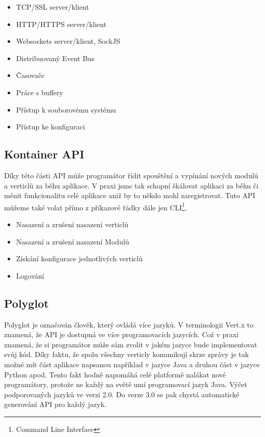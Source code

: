 \begin{itemize}
\item{TCP/SSL server/klient}
\item{HTTP/HTTPS server/klient}
\item{Websockets server/klient, SockJS}
\item{Distribuovaný Event Bus}
\item{Časovače}
\item{Práce s buffery}
\item{Přístup k souborovému systému}
\item{Přístup ke konfiguraci}
\end{itemize}

\subsection{Kontainer API}

Díky této části API může programátor řídit spouštění a vypínání nových modulů a verticlů za běhu aplikace. V praxi jsme tak schopní škálovat aplikaci za běhu či měnit funkcionalitu celé aplikace aniž by to někdo mohl zaregistrovat. Tuto API můžeme také volat přímo z příkazové řádky dále jen CLI\footnote{Command Line Interface}.

\begin{itemize}
\item{Nasazení a zrušení nasazení verticlů}
\item{Nasazení a zrušení nasazení Modulů}
\item{Získání konfigurace jednotlivých verticlů}
\item{Logování}
\end{itemize}

\subsection{Polyglot}

Polyglot je označován člověk, který ovládá více jazyků. V terminologii Vert.x to znamená, že API je dostupná ve více programovacích jazycích. Což v praxi znamená, že si programátor může sám zvolit v jakém jazyce bude implementovat svůj kód. Díky faktu, že spolu všechny verticly komunikují skrze zprávy je tak možné mít část aplikace napsanou například v jazyce Java a druhou část v jazyce Python apod. Tento fakt hodně napomáhá celé platformě nalákat nové programátory, protože ne každý na světě umí programovací jazyk Java. Výčet podporovaných jazyků ve verzi 2.0. Do verze 3.0 se pak chystá automatické generování API pro každý jazyk.

